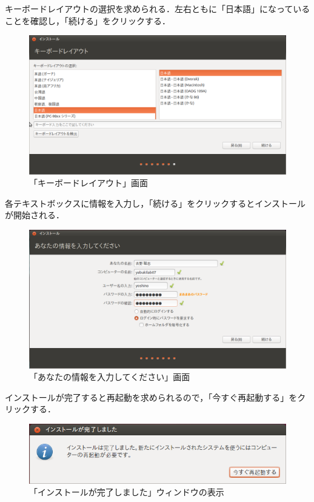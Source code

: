 キーボードレイアウトの選択を求められる．左右ともに「日本語」になっていることを確認し，「続ける」をクリックする．

\begin{figure}[H]
\centering
\includegraphics[width=13cm]{ubuntuinstall05.PNG}
\caption{「キーボードレイアウト」画面}\label{ubuntuinstall05}
\end{figure}

各テキストボックスに情報を入力し，「続ける」をクリックするとインストールが開始される．

\begin{figure}[H]
\centering
\includegraphics[width=13cm]{ubuntuinstall06.PNG}
\caption{「あなたの情報を入力してください」画面}\label{ubuntuinstall06}
\end{figure}

インストールが完了すると再起動を求められるので，「今すぐ再起動する」をクリックする．

\begin{figure}[H]
\centering
\includegraphics[width=13cm]{ubuntuinstallfinished.PNG}
\caption{「インストールが完了しました」ウィンドウの表示}\label{ubuntuinstallfinished}
\end{figure}

